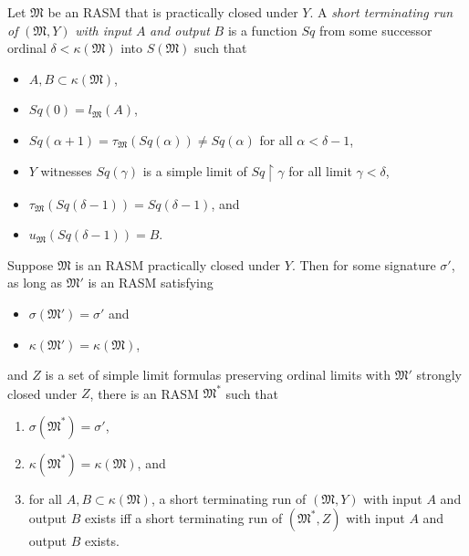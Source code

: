 \documentclass[12pt]{article}
\numberwithin{equation}{section}
\begin{document}
\begin{defi}
Let $\mathfrak{M}$ be an RASM that is practically closed under $Y$. A \emph{short terminating run of} $(\mathfrak{M}, Y)$ \emph{with input} $A$ \emph{and output} $B$ is a function $Sq$ from some successor ordinal $\delta < \kappa(\mathfrak{M})$ into $S(\mathfrak{M})$ such that 
\begin{itemize}
    \item $A, B \subset \kappa(\mathfrak{M})$,
    \item $Sq(0) = l_{\mathfrak{M}}(A)$,
    \item $Sq(\alpha + 1) = \tau_{\mathfrak{M}}(Sq(\alpha)) \neq Sq(\alpha)$ for all $\alpha < \delta - 1$,
    \item $Y$ witnesses $Sq(\gamma)$ is a simple limit of $Sq \restriction \gamma$ for all limit $\gamma < \delta$,
    \item $\tau_{\mathfrak{M}}(Sq(\delta - 1)) = Sq(\delta - 1)$, and
    \item $u_{\mathfrak{M}}(Sq(\delta - 1)) = B$.
\end{itemize}
\end{defi}

\begin{prop}\label{prop239}
Suppose $\mathfrak{M}$ is an RASM practically closed under $Y$. Then for some signature $\sigma'$, as long as $\mathfrak{M}'$ is an RASM satisfying 
\begin{itemize}
    \item $\sigma(\mathfrak{M}') = \sigma'$ and
    \item $\kappa(\mathfrak{M}') = \kappa(\mathfrak{M})$,
\end{itemize}
and $Z$ is a set of simple limit formulas preserving ordinal limits with $\mathfrak{M}'$ strongly closed under $Z$, there is an RASM $\mathfrak{M}^*$ such that
\begin{enumerate}[label=(\arabic*)]
    \item\label{2391} $\sigma(\mathfrak{M}^*) = \sigma'$,
    \item\label{2392} $\kappa(\mathfrak{M}^*) = \kappa(\mathfrak{M})$, and
    \item\label{2393} for all $A, B \subset \kappa(\mathfrak{M})$, a short terminating run of $(\mathfrak{M}, Y)$ with input $A$ and output $B$ exists iff a short terminating run of $(\mathfrak{M}^*, Z)$ with input $A$ and output $B$ exists.
\end{enumerate}
\end{prop}
\end{document}
